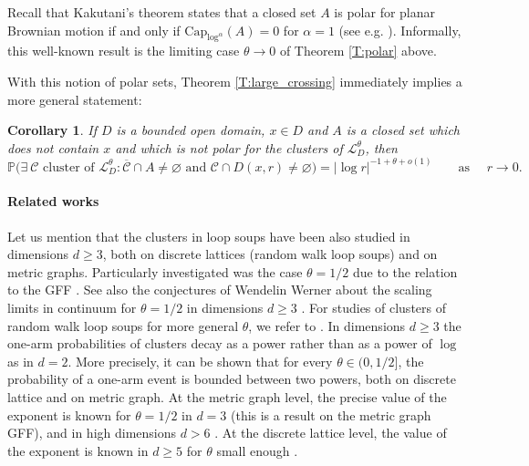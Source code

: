 \documentclass[11pt]{article}
\newtheorem{corollary}[theorem]{Corollary}
\theoremstyle{remark}
\newcommand{\Cc}{\mathcal{C}}
\newcommand{\Lc}{\mathcal{L}}
\renewcommand{\P}{\mathbb{P}}
\renewcommand{\Cap}{\mathrm{Cap}}
\numberwithin{equation}{section}
\begin{document}
Recall that Kakutani's theorem states that a closed set $A$ is polar for planar Brownian motion if and only if $\Cap_{\log^\alpha}(A) = 0$ for $\alpha = 1$ (see e.g. \cite[Theorem 8.20]{morters2010brownian}). Informally, this well-known result is the limiting case $\theta \to 0$ of Theorem \ref{T:polar} above.


With this notion of polar sets, Theorem \ref{T:large_crossing} immediately implies a more general statement:

\begin{corollary}\label{C:generalisation}
If $D$ is a bounded open domain, $x \in D$ and $A$ is a closed set which does not contain $x$ and which is not polar for the clusters of $\Lc_D^\theta$, then
\[
\P \Big( \exists ~\Cc \text{~cluster~of~} \Lc_D^\theta: \overline{\Cc} \cap A \neq \varnothing \text{~and~} \Cc \cap D(x,r) \neq \varnothing \Big) = |\log r|^{-1+ \theta +o(1)}
\quad \quad \text{as~} \quad r \to 0.
\]
\end{corollary}


\paragraph*{Related works}
Let us mention that the clusters in loop soups have been also studied in dimensions $d\geq 3$, both on discrete lattices (random walk loop soups) and on metric graphs. 
Particularly investigated was the case $\theta=1/2$ due to the relation to the GFF
\cite{MR4112719, MR4557402, ChangDuLi23crit, CaiDing23HighD}.
See also the conjectures of Wendelin Werner about the scaling limits in continuum
for $\theta=1/2$ in dimensions $d\geq 3$ \cite{MR4237293}.
For studies of clusters of random walk loop soups for more general $\theta$,
we refer to \cite{MR3263044, MR3477785, MR3692311, vogel2020geometric}.
In dimensions $d\geq 3$ the one-arm probabilities of clusters decay as a power rather than as a power of $\log$ as in $d=2$.
More precisely, it can be shown that for every $\theta\in (0,1/2]$, the probability of a one-arm event is bounded between two powers, both on discrete lattice and on metric graph. 
At the metric graph level, 
the precise value of the exponent is known for $\theta=1/2$ in $d=3$ 
\cite{MR4112719, MR4557402} (this is a result on the metric graph GFF),
and in high dimensions $d>6$ \cite{MR4237293, CaiDing23HighD}.
At the discrete lattice level, the value of the exponent is known
in $d\geq 5$ for $\theta$ small enough
\cite{MR3477785}.
\end{document}
